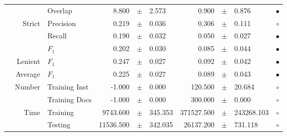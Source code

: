 \begin{longtable}{|r|r|l||rcl|rcl|c|}
&                             &         Overlap &       8.800 &  $\pm$  &       2.573 &       0.900 &  $\pm$  &       0.876 & $\bullet$ \\
& \multirow{3}{*}{    Strict} &       Precision &       0.219 &  $\pm$  &       0.036 &       0.306 &  $\pm$  &       0.111 & $\circ$ \\
&                             &          Recall &       0.190 &  $\pm$  &       0.032 &       0.050 &  $\pm$  &       0.027 & $\bullet$ \\
&                             &           $F_1$ &       0.202 &  $\pm$  &       0.030 &       0.085 &  $\pm$  &       0.044 & $\bullet$ \\
&                     Lenient &           $F_1$ &       0.247 &  $\pm$  &       0.027 &       0.092 &  $\pm$  &       0.042 & $\bullet$ \\
&                     Average &           $F_1$ &       0.225 &  $\pm$  &       0.027 &       0.089 &  $\pm$  &       0.043 & $\bullet$ \\
& \multirow{2}{*}{    Number} &   Training Inst &      -1.000 &  $\pm$  &       0.000 &     120.500 &  $\pm$  &      20.684 & $\circ$ \\
&                             &   Training Docs &      -1.000 &  $\pm$  &       0.000 &     300.000 &  $\pm$  &       0.000 & $\circ$ \\
& \multirow{2}{*}{      Time} &        Training &    9743.600 &  $\pm$  &     345.353 &  371527.500 &  $\pm$  &  243268.103 & $\circ$ \\
&                             &         Testing &   11536.500 &  $\pm$  &     342.035 &   26137.200 &  $\pm$  &     731.118 & $\circ$ \\
\hline
\hline
\end{longtable}

